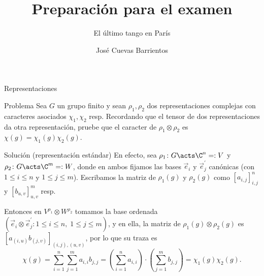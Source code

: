 \documentclass[10pt]{beamer}
\title{Preparación para el examen}
\subtitle{El último tango en París}
\date{\DTMdate{2025-06-26}}
\author{José Cuevas Barrientos}
\begin{document}
\maketitle

\begin{frame}{Representaciones}
	\begin{block}{Problema}
		Sea $G$ un grupo finito y sean $\rho_1, \rho_2$ dos representaciones complejas con caracteres asociados
		$\chi_1, \chi_2$ resp.
		Recordando que el tensor de dos representaciones da otra representación, pruebe que el caracter de
		$\rho_1\otimes \rho_2$ es $\chi(g) = \chi_1(g) \chi_2(g)$.
	\end{block}
\end{frame}
\begin{frame}{Solución (representación estándar)}
	En efecto, sea $\rho_1 \colon G \acts \C^n =: V$ y $\rho_2 \colon G \acts \C^m =: W$, donde en ambos fijamos las
	bases $\vec e_i$ y $\vec e_j^\prime$ canónicas (con $1\le i\le n$ y $1\le j\le m$).
	Escribamos la matriz de $\rho_1(g)$ y $\rho_2(g)$ como $[a_{i,j}]_{i,j}^n$ y $[b_{u,v}]_{u,v}^m$ resp.

	\pause
	Entonces en $V^{\rho_1} \otimes W^{\rho_2}$ tomamos la base ordenada $(\vec e_i \otimes \vec e_j^\prime : 1\le i\le n, \;
	1\le j\le m)$, y en ella, la matriz de $\rho_1(g)\otimes \rho_2(g)$ es $[ a_{(i,u)}b_{(j,v)} ]_{(i,j),(u,v)}$,
	por lo que su traza es
	\pause
	\[
		\chi(g) = \sum_{i=1}^{n} \sum_{j=1}^{m} a_{i,i}b_{j,j}
		= \left( \sum_{i=1}^{n} a_{i, i} \right)\cdot \left( \sum_{j=1}^{m} b_{j, j} \right)
		= \chi_1(g) \chi_2(g).
	\]
\end{frame}
\end{document}
